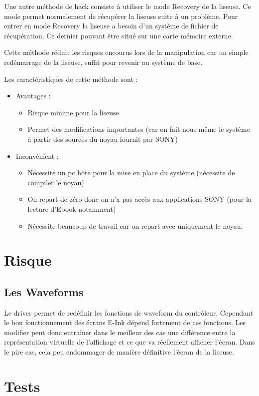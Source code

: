 Une autre méthode de hack consiste à utiliser le mode Recovery de la liseuse.
Ce mode permet normalement de récupérer la liseuse suite à un problème.
Pour entrer en mode Recovery la liseuse a besoin d'un système de fichier de récupération.
Ce dernier pouvant être situé sur une carte mémoire externe.

Cette méthode réduit les risques encourus lors de la manipulation car un simple redémarrage de la liseuse, 
suffit pour revenir au système de base.

Les caractéristiques de cette méthode sont  : 
\begin{itemize}
	\renewcommand{\labelitemi}{$\bullet$}
	\item Avantages : 
	\begin{itemize}
		\item Risque minime pour la liseuse
		\item Permet des modifications importantes (car on fait nous même le système à partir des sources du noyau fournit par SONY)%
	\end{itemize}
	\item Inconvénient : 
		\begin{itemize}
			\item Nécessite un pc hôte pour la mise en place du système (nécessite de compiler le noyau)
			\item On repart de zéro donc on n'a pas accès aux applications SONY (pour la lecture d'Ebook notamment)
			\item Nécessite beaucoup de travail car on repart avec uniquement le noyau.
		\end{itemize}
\end{itemize}
\section{Risque}
\subsection{Les Waveforms}
	Le driver permet de redéfinir les fonctions de waveform du contrôleur.
Cependant le bon fonctionnement des écrans E-Ink dépend fortement de ces fonctions. Les modifier peut donc entraîner dans le meilleur des cas une différence entre la représentation virtuelle de l'affichage et ce que va réellement afficher l'écran. Dans le pire cas, cela peu endommager de manière définitive l'écran de la liseuse.

\section{Tests}


